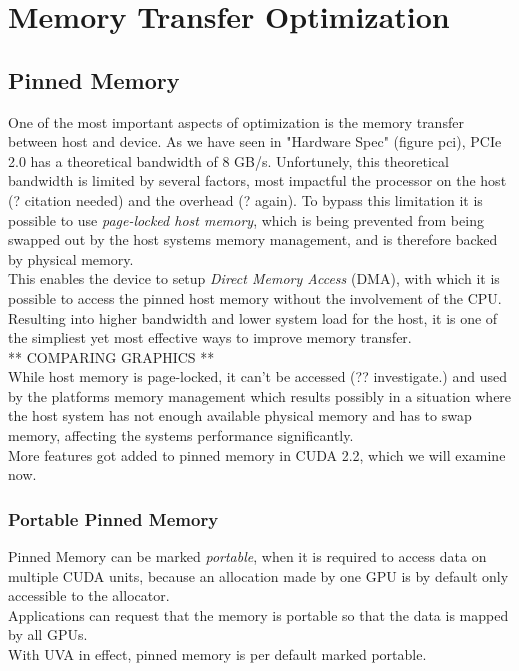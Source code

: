 \section{Memory Transfer Optimization}
\label{sec:transfer}
\subsection{Pinned Memory}
One of the most important aspects of optimization is the memory transfer between host and device.
As we have seen in "Hardware Spec" (figure pci), PCIe 2.0 has a theoretical bandwidth of 8 GB/s.
Unfortunely, this theoretical bandwidth is limited by several factors, most impactful the processor on the host (? citation needed) and the overhead (? again).
To bypass this limitation it is possible to use \emph{page-locked host memory}, which is being prevented from being swapped out by the host systems memory management, and is therefore backed by physical memory.\\
This enables the device to setup \emph{Direct Memory Access} (DMA), with which it is possible to access the pinned host memory without the involvement of the CPU.
Resulting into higher bandwidth and lower system load for the host, it is one of the simpliest yet most effective ways to improve memory transfer.\\
** COMPARING GRAPHICS **\\
While host memory is page-locked, it can't be accessed (?? investigate.) and used by the platforms memory management which results possibly in a situation where the host system has not enough available physical memory and has to swap memory, affecting the systems performance significantly.\\
More features got added to pinned memory in CUDA 2.2, which we will examine now.
\subsubsection{Portable Pinned Memory}
Pinned Memory can be marked \emph{portable}, when it is required to access data on multiple CUDA units, because an allocation made by one GPU is by default only accessible to the allocator.\\
Applications can request that the memory is portable so that the data is mapped by all GPUs.\\
With UVA in effect, pinned memory is per default marked portable.
